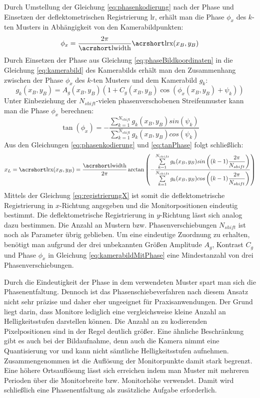 \p
Durch Umstellung der Gleichung \ref{eq:phasenkodierung} nach der Phase und Einsetzen der deflektometrischen Registrierung \acrshort{lr}, erhält man die Phase $\phi_x$ des $k$-ten Musters in Abhängigkeit von den Kamerabildpunkten:
%
\begin{equation}\label{eq:phaseBildkoordinaten}
	\phi_x = \dfrac{2\pi}{\acrshortmath{lwidth}}\acrshortmath{lrx}(x_B, y_B)
\end{equation}
%
Durch Einsetzen der Phase aus Gleichung \ref{eq:phaseBildkoordinaten} in die Gleichung \ref{eq:kamerabild} des Kamerabilds erhält man den Zusammenhang zwischen der Phase $\phi_x$ des $k$-ten Musters und dem Kamerabild   $g_k$:
%
\begin{equation}\label{eq:kamerabildMitPhase}
	g_k(x_B, y_B) = A_g(x_B, y_B) \left(1 + C_g(x_B, y_B) \cos \left(\phi_x(x_B, y_B) + \psi_k\right)\right)
\end{equation}
%
Unter Einbeziehung der $N_{shift}$-vielen phasenverschobenen Streifenmuster kann man die Phase $\phi_x$ berechnen\cite{kit_werling}:
%
\begin{equation}\label{eq:tanPhase}
	\tan (\phi_x) = -\dfrac{\sum\limits_{k=1}^{N_{shift}} g_k(x_B, y_B) sin(\psi_k)}{\sum\limits_{k=1}^{N_{shift}} g_k(x_B, y_B) cos(\psi_k)}
\end{equation}
%
Aus den Gleichungen \ref{eq:phasenkodierung} und \ref{eq:tanPhase} folgt schließlich:
%
\begin{equation}\label{eq:registrierungX}
	x_L = \acrshortmath{lrx}(x_B, y_B) = 
	\dfrac{\acrshortmath{lwidth}}{2\pi}
	\arctan 
	\left( 
		-\dfrac
		{\sum\limits_{k=1}^{N_{shift}} g_k(x_B, y_B) sin\left((k - 1)\dfrac{2\pi}{N_{shift}}\right)}
		{\sum\limits_{k=1}^{N_{shift}} g_k(x_B, y_B) cos\left((k - 1)\dfrac{2\pi}{N_{shift}}\right)}
	\right)
\end{equation}
%
Mittels der Gleichung \ref{eq:registrierungX} ist somit die deflektometrische Registrierung in $x$-Richtung angegeben und die Monitorpositionen eindeutig bestimmt.
Die deflektometrische Registrierung in $y$-Richtung lässt sich analog dazu bestimmen.
Die Anzahl an Mustern bzw. Phasenverschiebungen $N_{shift}$ ist noch als Parameter übrig geblieben.
Um eine eindeutige Zuordnung zu erhalten, benötigt man aufgrund der drei unbekannten Größen Amplitude $A_g$, Kontrast $C_g$ und Phase $\phi_x$ in Gleichung \ref{eq:kamerabildMitPhase} eine Mindestanzahl von drei Phasenverschiebungen.

\p
Durch die Eindeutigkeit der Phase in dem verwendeten Muster spart man sich die Phasenentfaltung.
Dennoch ist das Phasenschiebeverfahren nach diesem Ansatz nicht sehr präzise und daher eher ungeeignet für Praxisanwendungen.
Der Grund liegt darin, dass Monitore lediglich eine vergleichsweise kleine Anzahl an Helligkeitsstufen darstellen können.
Die Anzahl an zu kodierenden Pixelpositionen sind in der Regel deutlich größer.
Eine ähnliche Beschränkung gibt es auch bei der Bildaufnahme, denn auch die Kamera nimmt eine Quantisierung vor und kann nicht sämtliche Helligkeitsstufen aufnehmen.
Zusammengenommen ist die Auflösung der Monitorpunkte damit stark begrenzt.
Eine höhere Ortsauflösung lässt sich erreichen indem man Muster mit mehreren Perioden über die Monitorbreite bzw. Monitorhöhe verwendet.
Damit wird schließlich eine Phasenentfaltung als zusätzliche Aufgabe erforderlich.